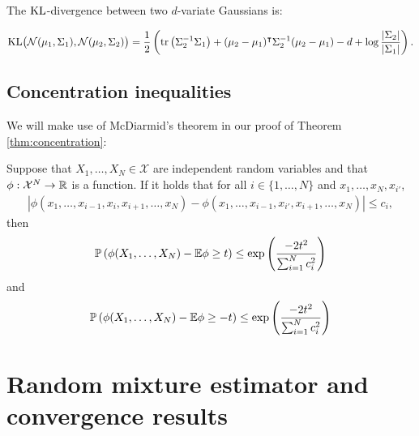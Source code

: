 The $\mathrm{KL}$-divergence between two $d$-variate Gaussians is:
 
\begin{lemma}
\begin{align*}
\mathrm{KL}\bigl( \mathcal{N}(\mu_1, \Sigma_1), 
\mathcal{N}(\mu_2, \Sigma_2)\bigr) = \frac{1}{2} \left( \text{tr}\left(\Sigma_2^{-1} \Sigma_1\right)
+ (\mu_2  - \mu_1)^\intercal \Sigma_2^{-1}(\mu_2 - \mu_1) - d + \log\frac{|\Sigma_2|}{|\Sigma_1|}
\right).
\end{align*}
\end{lemma}

\subsection{Concentration inequalities}


We will make use of McDiarmid's theorem in our proof of Theorem \ref{thm:concentration}:

\begin{theorem}\label{thm:mcdiarmid}
Suppose that $X_1, \ldots, X_N \in \mathcal{X}$ are independent random variables and that $\phi : \mathcal{X}^N \to \mathbb{R}$ is a function. 
If it holds that for all $i\in\{1,\ldots,N\}$ and $x_1, \ldots, x_N, x_{i'}$, 
\begin{align*}
    \left| \phi(x_1, \ldots, x_{i-1}, x_i, x_{i+1}, \ldots, x_N) - \phi(x_1, \ldots, x_{i-1}, x_{i'}, x_{i+1}, \ldots, x_N)\right| \leq c_i,
\end{align*}
then
\begin{align*}
    \mathbb{P} \left(\phi(X_1,\ldots, X_N) - \mathbb{E}\phi \geq t \right) \leq \exp\left(\frac{-2t^2}{\sum_{i=1}^N c^2_i} \right)
\end{align*}
and
\begin{align*}
    \mathbb{P} \left(\phi(X_1,\ldots, X_N) - \mathbb{E}\phi \geq -t \right) \leq \exp\left(\frac{-2t^2}{\sum_{i=1}^N c^2_i} \right)
\end{align*}
\end{theorem}




\section{Random mixture estimator and convergence results}\label{sec:theory}

